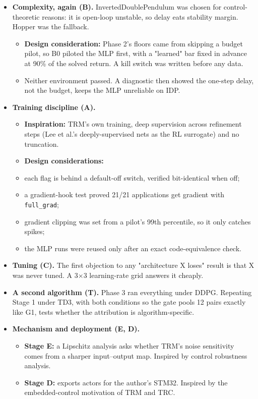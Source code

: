 \documentclass[11pt]{article}
\begin{document}
\begin{itemize}
\item \textbf{Complexity, again (B).} InvertedDoublePendulum was chosen for control-theoretic reasons: it is open-loop unstable, so delay eats stability margin. Hopper was the fallback.
\begin{itemize}
\item \textbf{Design consideration:} Phase 2's floors came from skipping a budget pilot, so B0 piloted the MLP first, with a "learned" bar fixed in advance at 90\% of the solved return. A kill switch was written before any data.
\item Neither environment passed. A diagnostic then showed the one-step delay, not the budget, keeps the MLP unreliable on IDP.
\end{itemize}
\item \textbf{Training discipline (A).}
\begin{itemize}
\item \textbf{Inspiration:} TRM's own training, deep supervision across refinement steps (Lee et al.'s deeply-supervised nets as the RL surrogate) and no truncation.
\item \textbf{Design considerations:}
\item each flag is behind a default-off switch, verified bit-identical when off;
\item a gradient-hook test proved 21/21 applications get gradient with \texttt{full\_grad};
\item gradient clipping was set from a pilot's 99th percentile, so it only catches spikes;
\item the MLP runs were reused only after an exact code-equivalence check.
\end{itemize}
\item \textbf{Tuning (C).} The first objection to any "architecture X loses" result is that X was never tuned. A 3$\times$3 learning-rate grid answers it cheaply.
\item \textbf{A second algorithm (T).} Phase 3 ran everything under DDPG. Repeating Stage 1 under TD3, with both conditions so the gate pools 12 pairs exactly like G1, tests whether the attribution is algorithm-specific.
\item \textbf{Mechanism and deployment (E, D).}
\begin{itemize}
\item \textbf{Stage E:} a Lipschitz analysis asks whether TRM's noise sensitivity comes from a sharper input--output map. Inspired by control robustness analysis.
\item \textbf{Stage D:} exports actors for the author's STM32. Inspired by the embedded-control motivation of TRM and TRC.
\end{itemize}
\end{itemize}
\end{document}
